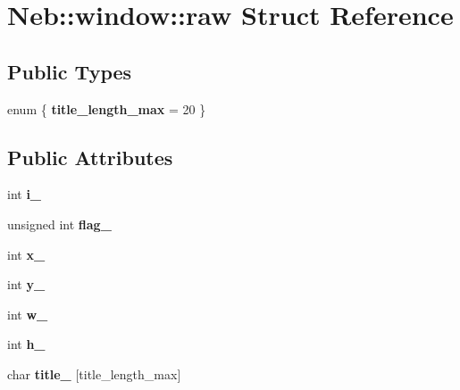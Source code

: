 \hypertarget{structNeb_1_1window_1_1raw}{\section{\-Neb\-:\-:window\-:\-:raw \-Struct \-Reference}
\label{structNeb_1_1window_1_1raw}
}
\subsection*{\-Public \-Types}
\begin{DoxyCompactItemize}
\item 
enum \{ {\bfseries title\-\_\-length\-\_\-max} =  20
 \}
\end{DoxyCompactItemize}
\subsection*{\-Public \-Attributes}
\begin{DoxyCompactItemize}
\item 
\hypertarget{structNeb_1_1window_1_1raw_ac2d99106d8032d157cb66ca692aeff8f}{int {\bfseries i\-\_\-}}\label{structNeb_1_1window_1_1raw_ac2d99106d8032d157cb66ca692aeff8f}

\item 
\hypertarget{structNeb_1_1window_1_1raw_a187363b5fae5c15e7235744dc9de7bf0}{unsigned int {\bfseries flag\-\_\-}}\label{structNeb_1_1window_1_1raw_a187363b5fae5c15e7235744dc9de7bf0}

\item 
\hypertarget{structNeb_1_1window_1_1raw_a3b273ad1ae7bcf1ae970e71d2693cf86}{int {\bfseries x\-\_\-}}\label{structNeb_1_1window_1_1raw_a3b273ad1ae7bcf1ae970e71d2693cf86}

\item 
\hypertarget{structNeb_1_1window_1_1raw_af41502c09220bda97a5b7affa78289b7}{int {\bfseries y\-\_\-}}\label{structNeb_1_1window_1_1raw_af41502c09220bda97a5b7affa78289b7}

\item 
\hypertarget{structNeb_1_1window_1_1raw_aa923cceefa9f2f721465c4369ff1dd7d}{int {\bfseries w\-\_\-}}\label{structNeb_1_1window_1_1raw_aa923cceefa9f2f721465c4369ff1dd7d}

\item 
\hypertarget{structNeb_1_1window_1_1raw_ac4be48fbeb00c89151f8f36528a4fbc7}{int {\bfseries h\-\_\-}}\label{structNeb_1_1window_1_1raw_ac4be48fbeb00c89151f8f36528a4fbc7}

\item 
\hypertarget{structNeb_1_1window_1_1raw_aa97e82faf39cfcdf355bfe1efca9f3da}{char {\bfseries title\-\_\-} \mbox{[}title\-\_\-length\-\_\-max\mbox{]}}\label{structNeb_1_1window_1_1raw_aa97e82faf39cfcdf355bfe1efca9f3da}

\end{DoxyCompactItemize}


